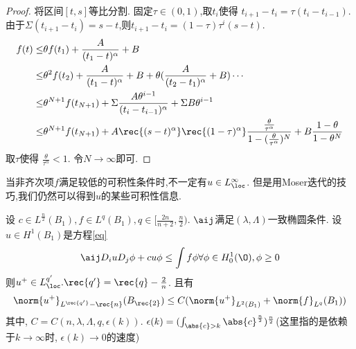 \begin{proof}
    将区间$[t,s]$等比分割. 固定$\tau \in (0,1)$,取$t_i$使得 $t_{i+1}-t_i=\tau(t_i-t_{i-1})$. 由于$\Sigma(t_{i+1}-t_i)=s-t$,则$t_{i+1}-t_i=(1-\tau)\tau^i(s-t)$.
    \begin{equation}
        \begin{split}
            f(t) \le & \theta f(t_1) + \frac{A}{(t_1-t)^\alpha}+B \\
            \le & \theta^2 f(t_2)+\frac{A }{(t_1-t)^\alpha}+B+\theta(\frac{A}{(t_2-t_1)^\alpha}+B)\cdots \\
            \le & \theta^{N+1}f(t_{N+1})+\Sigma \frac{A\theta^{i-1}}{(t_i-t_{i-1})^\alpha} + \Sigma B \theta^{i-1}\\
            \le & \theta^{N+1}f(t_{N+1})+A\rec{(s-t)^\alpha}\rec{(1-\tau)^\alpha}\frac{\frac{\theta}{\tau^\alpha}}{1-(\frac{\theta}{\tau^\alpha})^N}+B\frac{1-\theta}{1-\theta^N}
        \end{split}
    \end{equation}
    取$\tau$使得 $\frac{\theta}{\tau^\alpha} < 1$.  令$N \to \infty$即可.
\end{proof}
当非齐次项$f$满足较低的可积性条件时,不一定有$u \in L^\infty_\loc$. 但是用Moser迭代的技巧,我们仍然可以得到$u$的某些可积性信息.
\begin{theorem}
    设 $c \in L^{\frac{n }{2}}(B_1), f \in L^q(B_1), q \in [\frac{2n}{n+2},\frac{n}{2})$. $\aij$满足$(\lambda,\Lambda)$一致椭圆条件. 设$u \in H^1(B_1)$是方程\eqref{eq}
    \begin{equation}
        \aij D_iu D_j\phi + cu\phi \le \int f\phi \forall \phi \in H^1_0(\O), \phi \ge 0
    \end{equation}
    则$u^+\in L^{q'}_{\loc}. \rec{q'}=\rec{q}-\frac{2}{n}$. 且有
    \begin{equation}
        \norm{u^+}_{L^\rec{q'}-\rec{n}}(B_\rec{2}) \le C(\norm{u^+}_{L^2(B_1)}+\norm{f}_{L^q}(B_1))
    \end{equation}
    其中, $C=C(n,\lambda,\Lambda,q,\epsilon(k))$. $\epsilon(k)=(\int_{\abs{c}>k}\abs{c}^\frac{n}{2})^\frac{n}{2}$(这里指的是依赖于$k\to \infty$时, $\epsilon(k) \to 0$的速度)
\end{theorem}
